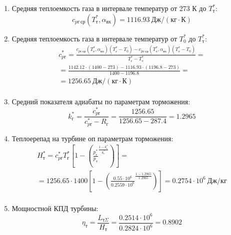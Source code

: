 \documentclass[a4paper,10pt]{article}
\begin{document}
\begin{enumerate}
        \item Средняя теплоемкость газа в интервале температур от 273 К до $T_т^*$:
        \[
            c_{pг\ ср} (T_т^*, \alpha_{вх}) =
            1116.93 \ Дж/(кг \cdot К)
        \]

        \item Средняя теплоемкость газа в интервале температур от $T_0^*$ до $T_т^*$:
        \begin{gather*}
            c_{pг}^* = \frac{
		         c_{pг\ ср} (T_г^*, \alpha_{вх}) (T_г^* - T_0) - c_{pг\ ср} (T_т^*, \alpha_{вх})(T_т^* - T_0)
		    }{
		        T_г^* - T_т^*} =\\
            =\frac{
                1142.12 \cdot
                (1400 - 273) -
		        1116.93 \cdot
                (1196.8 - 273)
		    }{
		        1400 - 1196.8} =\\
		     = 1256.65 \ Дж / (кг \cdot К)\\
        \end{gather*}

        \item Средний показателя адиабаты по параметрам торможения:
        \[
            k_г^* = \frac{ c_{pг}^* }{ c_{pг}^* - R_г } =
                \frac{
                    1256.65
                }{
                    1256.65 - 287.4
                }
            = 1.2965
        \]

        \item Теплоерепад на турбине оп параметрам торможения:
        \begin{gather*}
            H_т^* = c_{pг}^* T_г^* \left[
                        1 - \left(
                                \frac{p_г^*}{p_т} ^
                                \frac{1 - k_г^*}{k_г^*}
                    \right)
                \right] =\\
            =1256.65 \cdot 1400
                \left[
                    1 - \left(
                            \frac{
                                0.55 \cdot 10^6
                            }{
                                0.2559 \cdot 10^6 } ^
                            \frac{ 1 - 1.2965 }{ 1.2965 }
                    \right)
            \right] =
            0.2754 \cdot 10^6 \ Дж/кг\\
        \end{gather*}

        \item Мощностной КПД турбины:
        \[
            \eta_т = \frac{ L_{т\Sigma} }{ H_т } =
                \frac{ 0.2514 \cdot 10^6 }{ 0.2824 \cdot 10^6 } =
            0.8902
        \]


\end{enumerate}
\end{document}
